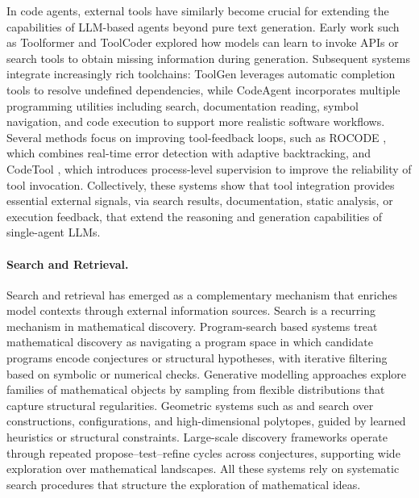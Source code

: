 In code agents, external tools have similarly become crucial for extending the capabilities of 
LLM-based agents beyond pure text generation. Early work such as Toolformer \citep{schick2023toolformer} 
and ToolCoder \citep{zhang2023toolcoder} explored how models can learn to invoke APIs or search tools 
to obtain missing information during generation. Subsequent systems integrate increasingly rich 
toolchains: ToolGen \citep{wang2024toolgen} leverages automatic completion tools to resolve undefined 
dependencies, while CodeAgent \citep{zhang2024codeagent} incorporates multiple programming utilities 
 including search, documentation reading, symbol navigation, and code execution to support more 
realistic software workflows. Several methods focus on improving tool-feedback loops, such as ROCODE 
\citep{jiang2024rocode}, which combines real-time error detection with adaptive backtracking, and 
CodeTool \citep{lu2025codetool}, which introduces process-level supervision to improve the reliability 
of tool invocation. Collectively, these systems show that tool integration provides essential external 
signals, via search results, documentation, static analysis, or execution feedback, that extend the 
reasoning and generation capabilities of single-agent LLMs.

\paragraph{Search and Retrieval.}

Search and retrieval has emerged as a complementary mechanism that enriches model contexts through external information sources.
Search is a recurring mechanism in mathematical discovery. Program-search based systems \citep{romera2024mathematical} treat mathematical discovery as navigating a program space in which candidate programs encode conjectures or structural hypotheses, with iterative filtering based on symbolic or numerical checks. Generative modelling approaches \citep{ellenberg2025generative} explore families of mathematical objects by sampling from flexible distributions that capture structural regularities. Geometric systems such as \citet{trinh2024solving} and \citet{swirszcz2025advancing} search over constructions, configurations, and high-dimensional polytopes, guided by learned heuristics or structural constraints. Large-scale discovery frameworks \citep{georgiev2025mathematical} operate through repeated propose--test--refine cycles across conjectures, supporting wide exploration over mathematical landscapes. All these systems rely on systematic search procedures that structure the exploration of mathematical ideas.

